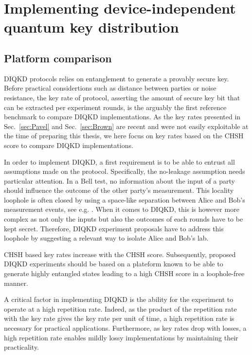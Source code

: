 \chapter{Implementing device-independent quantum key distribution}
\label{chap:implementing_diqkd}

\section{Platform comparison}

DIQKD protocols relies on entanglement to generate a provably secure key.
Before practical considertions such as distance between parties or noise resistance, the key rate of protocol, asserting the amount of secure key bit that can be extracted per experiment rounds, is the arguably the first reference benchmark to compare DIQKD implementations.
As the key rates presented in Sec.~\ref{sec:Pavel} and Sec.~\ref{sec:Brown} are recent and were not easily exploitable at the time of preparing this thesis, we here focus on key rates based on the CHSH score to compare DIQKD implementations.

\medbreak

In order to implement DIQKD, a first requirement is to be able to entrust all assumptions made on the protocol.
Specifically, the no-leakage assumption needs particular attention.
In a Bell test, no information about the input of a party should influence the outcome of the other party's measurement.
This locality loophole is often closed by using a space-like separation between Alice and Bob's measurement events, see e.g. \cite{Hensen2015,Giustina2015,Shalm2015}.
When it comes to DIQKD, this is however more complex as not only the inputs but also the outcomes of each rounds have to be kept secret.
Therefore, DIQKD experiment proposals have to address this loophole by suggesting a relevant way to isolate Alice and Bob's lab.

\medbreak

CHSH based key rates increase with the CHSH score.
Subsequently, proposed DIQKD experiments should be based on a plateform known to be able to generate highly entangled states leading to a high CHSH score in a loophole-free manner.

\medbreak

A critical factor in implementing DIQKD is the ability for the experiment to operate at a high repetition rate.
Indeed, as the product of the repetition rate with the key rate gives the key rate per unit of time, a high repetition rate is necessary for practical applications.
Furthermore, as key rates drop with losses, a high repetition rate enables mildly lossy implementations by maintaining their practicality.



